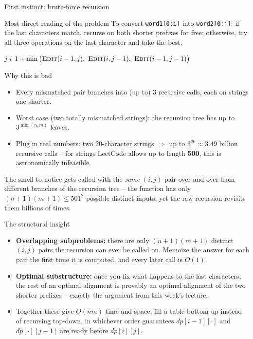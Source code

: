 \documentclass[11pt,aspectratio=169]{beamer}
\begin{document}
\begin{frame}{First instinct: brute-force recursion}
  \begin{block}{Most direct reading of the problem}
    To convert \texttt{word1[0:i]} into \texttt{word2[0:j]}: if the last characters
    match, recurse on both shorter prefixes for free; otherwise, try all three
    operations on the last character and take the best.
  \end{block}
  \begin{algorithmic}[1]
       \Return $j$  \Return $i$ \EndIf
        \State \Return {}
      \Else
        \State \Return $1 + \min\big(\Call{Edit}{i-1,j},\ \Call{Edit}{i,j-1},\
        \Call{Edit}{i-1,j-1}\big)$
      \EndIf
    \EndFunction
  \end{algorithmic}
\end{frame}

\begin{frame}{Why this is bad}
  \begin{itemize}
    \item Every mismatched pair branches into (up to) 3 recursive calls, each on
    strings one shorter.
    \item Worst case (two totally mismatched strings): the recursion tree has up to
    $3^{\min(n,m)}$ leaves.
    \item Plug in real numbers: two 20-character strings $\Rightarrow$ up to
    $3^{20} \approx 3.49$ billion recursive calls -- for strings LeetCode allows up to
    length \textbf{500}, this is astronomically infeasible.
  \end{itemize}
  \begin{alertblock}{The smell to notice}
     gets called with the \emph{same} $(i,j)$ pair over and over from
    different branches of the recursion tree -- the function has only
    $(n+1)(m+1) \le 501^2$ possible distinct inputs, yet the raw recursion revisits them
    billions of times.
  \end{alertblock}
\end{frame}

\begin{frame}{The structural insight}
  \begin{itemize}
    \item \textbf{Overlapping subproblems:} there are only $(n+1)(m+1)$ distinct
    $(i,j)$ pairs the recursion can ever be called on. Memoize the answer for each pair
    the first time it is computed, and every later call is $O(1)$.
    \item \textbf{Optimal substructure:} once you fix what happens to the last
    characters, the rest of an optimal alignment is provably an optimal alignment of
    the two shorter prefixes -- exactly the argument from this week's lecture.
    \item Together these give $O(nm)$ time and space: fill a table bottom-up instead of
    recursing top-down, in whichever order guarantees $dp[i-1][\cdot]$ and
    $dp[\cdot][j-1]$ are ready before $dp[i][j]$.
  \end{itemize}
\end{frame}
\end{document}
